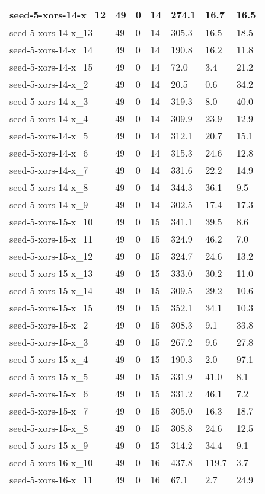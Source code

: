 \begin{scriptsize}
\begin{longtable}{|p{5cm}|l|l|l|l|l|l|}
seed-5-xors-14-x\_12&49&0&14&274.1&16.7&16.5 \\ \hline 
seed-5-xors-14-x\_13&49&0&14&305.3&16.5&18.5 \\ \hline 
seed-5-xors-14-x\_14&49&0&14&190.8&16.2&11.8 \\ \hline 
seed-5-xors-14-x\_15&49&0&14&72.0&3.4&21.2 \\ \hline 
seed-5-xors-14-x\_2&49&0&14&20.5&0.6&34.2 \\ \hline 
seed-5-xors-14-x\_3&49&0&14&319.3&8.0&40.0 \\ \hline 
seed-5-xors-14-x\_4&49&0&14&309.9&23.9&12.9 \\ \hline 
seed-5-xors-14-x\_5&49&0&14&312.1&20.7&15.1 \\ \hline 
seed-5-xors-14-x\_6&49&0&14&315.3&24.6&12.8 \\ \hline 
seed-5-xors-14-x\_7&49&0&14&331.6&22.2&14.9 \\ \hline 
seed-5-xors-14-x\_8&49&0&14&344.3&36.1&9.5 \\ \hline 
seed-5-xors-14-x\_9&49&0&14&302.5&17.4&17.3 \\ \hline 
seed-5-xors-15-x\_10&49&0&15&341.1&39.5&8.6 \\ \hline 
seed-5-xors-15-x\_11&49&0&15&324.9&46.2&7.0 \\ \hline 
seed-5-xors-15-x\_12&49&0&15&324.7&24.6&13.2 \\ \hline 
seed-5-xors-15-x\_13&49&0&15&333.0&30.2&11.0 \\ \hline 
seed-5-xors-15-x\_14&49&0&15&309.5&29.2&10.6 \\ \hline 
seed-5-xors-15-x\_15&49&0&15&352.1&34.1&10.3 \\ \hline 
seed-5-xors-15-x\_2&49&0&15&308.3&9.1&33.8 \\ \hline 
seed-5-xors-15-x\_3&49&0&15&267.2&9.6&27.8 \\ \hline 
seed-5-xors-15-x\_4&49&0&15&190.3&2.0&97.1 \\ \hline 
seed-5-xors-15-x\_5&49&0&15&331.9&41.0&8.1 \\ \hline 
seed-5-xors-15-x\_6&49&0&15&331.2&46.1&7.2 \\ \hline 
seed-5-xors-15-x\_7&49&0&15&305.0&16.3&18.7 \\ \hline 
seed-5-xors-15-x\_8&49&0&15&308.8&24.6&12.5 \\ \hline 
seed-5-xors-15-x\_9&49&0&15&314.2&34.4&9.1 \\ \hline 
seed-5-xors-16-x\_10&49&0&16&437.8&119.7&3.7 \\ \hline 
seed-5-xors-16-x\_11&49&0&16&67.1&2.7&24.9 \\ \hline 

\end{longtable}
\end{scriptsize}
